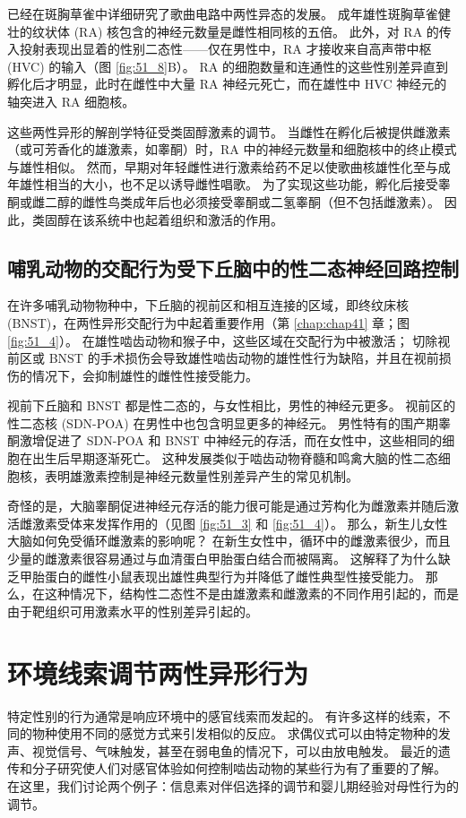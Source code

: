 已经在斑胸草雀中详细研究了歌曲电路中两性异态的发展。 成年雄性斑胸草雀健壮的纹状体 (RA) 核包含的神经元数量是雌性相同核的五倍。 此外，对 RA 的传入投射表现出显着的性别二态性——仅在男性中，RA 才接收来自高声带中枢 (HVC) 的输入（图 \ref{fig:51_8}B）。 RA 的细胞数量和连通性的这些性别差异直到孵化后才明显，此时在雌性中大量 RA 神经元死亡，而在雄性中 HVC 神经元的轴突进入 RA 细胞核。

这些两性异形的解剖学特征受类固醇激素的调节。 当雌性在孵化后被提供雌激素（或可芳香化的雄激素，如睾酮）时，RA 中的神经元数量和细胞核中的终止模式与雄性相似。 然而，早期对年轻雌性进行激素给药不足以使歌曲核雄性化至与成年雄性相当的大小，也不足以诱导雌性唱歌。 为了实现这些功能，孵化后接受睾酮或雌二醇的雌性鸟类成年后也必须接受睾酮或二氢睾酮（但不包括雌激素）。 因此，类固醇在该系统中也起着组织和激活的作用。

\subsection{哺乳动物的交配行为受下丘脑中的性二态神经回路控制}

在许多哺乳动物物种中，下丘脑的视前区和相互连接的区域，即终纹床核 (BNST)，在两性异形交配行为中起着重要作用（第 \ref{chap:chap41} 章；图 \ref{fig:51_4}）。 在雄性啮齿动物和猴子中，这些区域在交配行为中被激活； 切除视前区或 BNST 的手术损伤会导致雄性啮齿动物的雄性性行为缺陷，并且在视前损伤的情况下，会抑制雄性的雌性性接受能力。

视前下丘脑和 BNST 都是性二态的，与女性相比，男性的神经元更多。 视前区的性二态核 (SDN-POA) 在男性中也包含明显更多的神经元。 男性特有的围产期睾酮激增促进了 SDN-POA 和 BNST 中神经元的存活，而在女性中，这些相同的细胞在出生后早期逐渐死亡。 这种发展类似于啮齿动物脊髓和鸣禽大脑的性二态细胞核，表明雄激素控制是神经元数量性别差异产生的常见机制。

奇怪的是，大脑睾酮促进神经元存活的能力很可能是通过芳构化为雌激素并随后激活雌激素受体来发挥作用的（见图 \ref{fig:51_3} 和 \ref{fig:51_4}）。 那么，新生儿女性大脑如何免受循环雌激素的影响呢？ 在新生女性中，循环中的雌激素很少，而且少量的雌激素很容易通过与血清蛋白甲胎蛋白结合而被隔离。 这解释了为什么缺乏甲胎蛋白的雌性小鼠表现出雄性典型行为并降低了雌性典型性接受能力。 那么，在这种情况下，结构性二态性不是由雄激素和雌激素的不同作用引起的，而是由于靶组织可用激素水平的性别差异引起的。

\section{环境线索调节两性异形行为}
特定性别的行为通常是响应环境中的感官线索而发起的。 有许多这样的线索，不同的物种使用不同的感觉方式来引发相似的反应。 求偶仪式可以由特定物种的发声、视觉信号、气味触发，甚至在弱电鱼的情况下，可以由放电触发。 最近的遗传和分子研究使人们对感官体验如何控制啮齿动物的某些行为有了重要的了解。 在这里，我们讨论两个例子：信息素对伴侣选择的调节和婴儿期经验对母性行为的调节。

